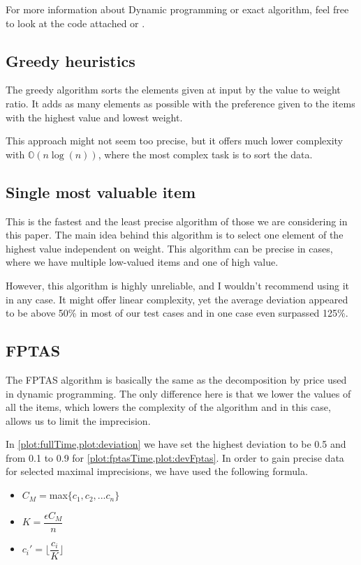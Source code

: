 For more information about Dynamic programming or exact algorithm, feel free to look at the code attached or \cite[Moodle textbook]{WEBSITE:dynamicKnapsack}.

\subsection{Greedy heuristics}
The greedy algorithm sorts the elements given at input by the value to weight ratio. It adds as many elements as possible with the preference given to the items with the highest value and lowest weight.

This approach might not seem too precise, but it offers much lower complexity with $\mathbb{O}(n \log(n))$, where the most complex task is to sort the data.

\subsection{Single most valuable item}
This is the fastest and the least precise algorithm of those we are considering in this paper. The main idea behind this algorithm is to select one element of the highest value independent on weight. This algorithm can be precise in cases, where we have multiple low-valued items and one of high value.

However, this algorithm is highly unreliable, and I wouldn't recommend using it in any case. It might offer linear complexity, yet the average deviation appeared to be above 50\% in most of our test cases and in one case even surpassed 125\%.

\subsection{FPTAS}

The FPTAS algorithm is basically the same as the decomposition by price used in dynamic programming.
The only difference here is that we lower the values of all the items, which lowers the complexity
of the algorithm and in this case, allows us to limit the imprecision.

In \cref{plot:fullTime,plot:deviation} we have set the highest deviation to be 0.5 and from 0.1 to 0.9 for \cref{plot:fptasTime,plot:devFptas}.
In order to gain precise data for selected maximal imprecisions, we have used the following formula.

\begin{itemize}
    \item $C_M = $max$\{c_1,c_2, ... c_n\}$
    \item $K = \dfrac{\epsilon C_M}{n}$
    \item $c_i' = \lfloor\dfrac{c_i}{K}\rfloor$
\end{itemize}

